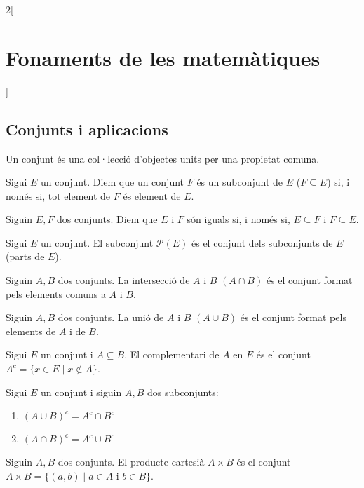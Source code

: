 \documentclass[class=article,10pt,crop=false]{standalone}
\begin{document}
\begin{multicols}{2}[\section{Fonaments de les matemàtiques}]
\subsection{Conjunts i aplicacions}
\begin{definition}
Un conjunt és una col·lecció d'objectes units per una propietat comuna.
\end{definition}
\begin{definition}
Sigui $E$ un conjunt. Diem que un conjunt $F$ és un subconjunt de $E$ ($F\subseteq E$) si, i només si, tot element de $F$ és element de $E$.
\end{definition}
\begin{definition}
Siguin $E,F$ dos conjunts. Diem que $E$ i $F$ són iguals si, i només si, $E\subseteq F$ i $F\subseteq E$.
\end{definition}
\begin{definition}
Sigui $E$ un conjunt. El subconjunt $\mathcal{P}(E)$ és el conjunt dels subconjunts de $E$ (parts de $E$).
\end{definition}
\begin{definition}
Siguin $A, B$ dos conjunts. La intersecció de $A$ i $B$ $(A\cap B)$ és el conjunt format pels elements comuns a $A$ i $B$.
\end{definition}
\begin{definition}
Siguin $A, B$ dos conjunts. La unió de $A$ i $B$ $(A\cup B)$ és el conjunt format pels elements de $A$ i de $B$.
\end{definition}
\begin{definition}
Sigui $E$ un conjunt i $A\subseteq B$. El complementari de $A$ en $E$ és el conjunt $A^c=\{x\in E\mid x\notin A\}$.
\end{definition}
\begin{prop}
Sigui $E$ un conjunt i siguin $A,B$ dos subconjunts:
\begin{enumerate}
    \item $(A\cup B)^c=A^c\cap B^c$
    \item $(A\cap B)^c=A^c\cup B^c$
\end{enumerate}
\end{prop}
\begin{definition}
Siguin $A, B$ dos conjunts. El producte cartesià $A\times B$ és el conjunt $A\times B=\{(a,b)\mid a\in A\text{ i }b\in B\}$.

\end{definition}
\end{multicols}
\end{document}
